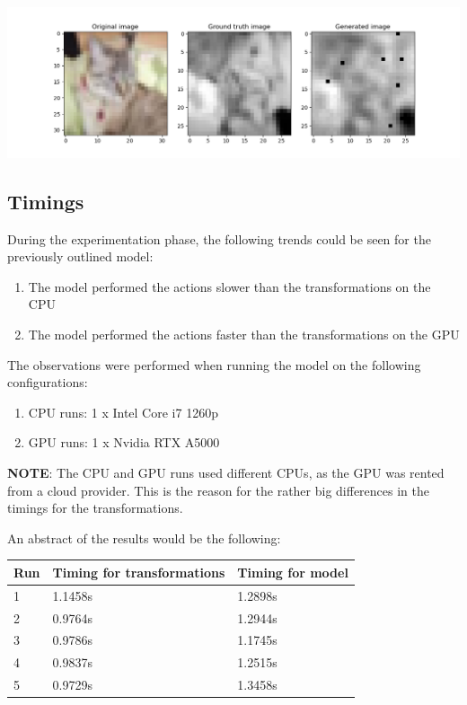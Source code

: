 \documentclass[conference]{IEEEtran}
\begin{document}
\begin{center}
    \begin{minipage}{0.75\linewidth}
        \includegraphics[width=\linewidth]{images/output_8.png}
    \end{minipage}
\end{center}

\subsection{Timings}
During the experimentation phase, the following trends could be seen for the previously outlined model:

\begin{enumerate}
    \item The model performed the actions slower than the transformations on the CPU
    \item The model performed the actions faster than the transformations on the GPU
\end{enumerate}

The observations were performed when running the model on the following configurations:

\begin{enumerate}
    \item CPU runs: 1 x Intel Core i7 1260p
    \item GPU runs: 1 x Nvidia RTX A5000
\end{enumerate}

\textbf{NOTE}: The CPU and GPU runs used different CPUs, as the GPU was rented from a cloud provider. This is the reason
for the rather big differences in the timings for the transformations.

An abstract of the results would be the following:

\begin{center}
    \begin{tabular}{|l|l|l|}
    \hline
        Run & Timing for transformations & Timing for model \\ \hline
        1 & 1.1458s & 1.2898s \\ \hline
        2 & 0.9764s & 1.2944s \\ \hline
        3 & 0.9786s & 1.1745s \\ \hline
        4 & 0.9837s & 1.2515s \\ \hline
        5 & 0.9729s & 1.3458s \\ \hline
    \end{tabular}
\end{center}
\end{document}
